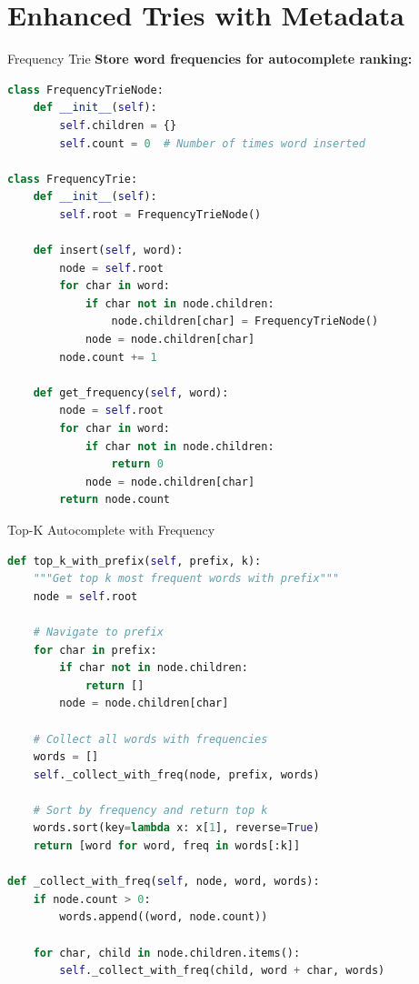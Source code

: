 \documentclass[aspectratio=169]{beamer}
\begin{document}
\section{Enhanced Tries with Metadata}

\begin{frame}[fragile]{Frequency Trie}
  \textbf{Store word frequencies for autocomplete ranking:}

  \begin{lstlisting}[language=Python, basicstyle=\ttfamily\small]
class FrequencyTrieNode:
    def __init__(self):
        self.children = {}
        self.count = 0  # Number of times word inserted

class FrequencyTrie:
    def __init__(self):
        self.root = FrequencyTrieNode()

    def insert(self, word):
        node = self.root
        for char in word:
            if char not in node.children:
                node.children[char] = FrequencyTrieNode()
            node = node.children[char]
        node.count += 1

    def get_frequency(self, word):
        node = self.root
        for char in word:
            if char not in node.children:
                return 0
            node = node.children[char]
        return node.count
  \end{lstlisting}
\end{frame}

\begin{frame}[fragile]{Top-K Autocomplete with Frequency}
  \begin{lstlisting}[language=Python, basicstyle=\ttfamily\footnotesize]
def top_k_with_prefix(self, prefix, k):
    """Get top k most frequent words with prefix"""
    node = self.root

    # Navigate to prefix
    for char in prefix:
        if char not in node.children:
            return []
        node = node.children[char]

    # Collect all words with frequencies
    words = []
    self._collect_with_freq(node, prefix, words)

    # Sort by frequency and return top k
    words.sort(key=lambda x: x[1], reverse=True)
    return [word for word, freq in words[:k]]

def _collect_with_freq(self, node, word, words):
    if node.count > 0:
        words.append((word, node.count))

    for char, child in node.children.items():
        self._collect_with_freq(child, word + char, words)
  \end{lstlisting}
\end{frame}
\end{document}
